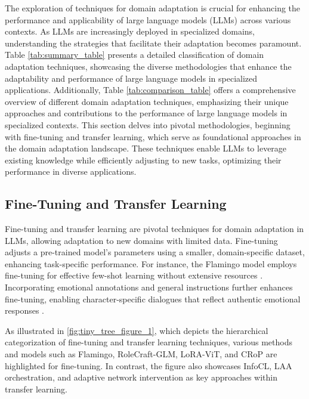 The exploration of techniques for domain adaptation is crucial for enhancing the performance and applicability of large language models (LLMs) across various contexts. As LLMs are increasingly deployed in specialized domains, understanding the strategies that facilitate their adaptation becomes paramount. Table \ref{tab:summary_table} presents a detailed classification of domain adaptation techniques, showcasing the diverse methodologies that enhance the adaptability and performance of large language models in specialized applications. Additionally, Table \ref{tab:comparison_table} offers a comprehensive overview of different domain adaptation techniques, emphasizing their unique approaches and contributions to the performance of large language models in specialized contexts. This section delves into pivotal methodologies, beginning with fine-tuning and transfer learning, which serve as foundational approaches in the domain adaptation landscape. These techniques enable LLMs to leverage existing knowledge while efficiently adjusting to new tasks, optimizing their performance in diverse applications.



\subsection{Fine-Tuning and Transfer Learning} \label{subsec:Fine-Tuning and Transfer Learning}

Fine-tuning and transfer learning are pivotal techniques for domain adaptation in LLMs, allowing adaptation to new domains with limited data. Fine-tuning adjusts a pre-trained model's parameters using a smaller, domain-specific dataset, enhancing task-specific performance. For instance, the Flamingo model employs fine-tuning for effective few-shot learning without extensive resources \cite{alayrac2022flamingo}. Incorporating emotional annotations and general instructions further enhances fine-tuning, enabling character-specific dialogues that reflect authentic emotional responses \cite{tao2024rolecraftglmadvancingpersonalizedroleplaying}.

As illustrated in \autoref{fig:tiny_tree_figure_1}, which depicts the hierarchical categorization of fine-tuning and transfer learning techniques, various methods and models such as Flamingo, RoleCraft-GLM, LoRA-ViT, and CRoP are highlighted for fine-tuning. In contrast, the figure also showcases InfoCL, LAA orchestration, and adaptive network intervention as key approaches within transfer learning.


